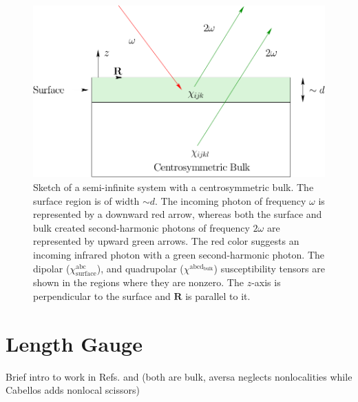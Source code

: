 \begin{figure}[t]
\centering
\includegraphics[scale=0.6]{content/figures/diag-system}
\caption{Sketch of a semi-infinite system with a centrosymmetric bulk. The
surface region is of width $\sim d$. The incoming photon of frequency $\omega$
is represented by a downward red arrow, whereas both the surface and bulk
created second-harmonic photons of frequency $2\omega$ are represented by upward
green arrows. The red color suggests an incoming infrared photon with a green
second-harmonic photon. The dipolar ($\chi^{\mathrm{abc}}_{\mathrm{surface}}$),
and quadrupolar ($\chi^{\mathrm{abcd}_{\mathrm{bulk}}}$) susceptibility tensors
are shown in the regions where they are nonzero. The $z$-axis is perpendicular
to the surface and $\mathbf{R}$ is parallel to it.}
\label{fsystem}
\end{figure}



\section{Length Gauge}\label{longi}

{\color{red} Brief intro to work in Refs. \cite{aversaPRB95} and
\cite{cabellosPRB09} (both are bulk, aversa neglects nonlocalities while
Cabellos adds nonlocal scissors)}

